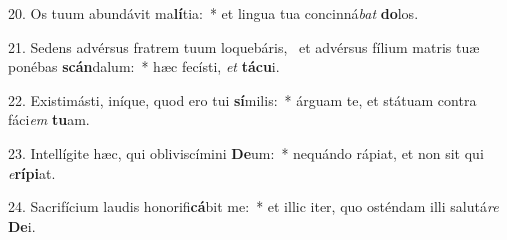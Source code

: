 20. Os tuum abundávit ma\textbf{lí}tia:~*  et lingua tua concinná\textit{bat} \textbf{do}los.\

21. Sedens advérsus fratrem tuum loquebáris, \dag\  et advérsus fílium matris tuæ ponébas \textbf{scán}dalum:~*  hæc fecísti, \textit{et} \textbf{tá}\textbf{cu}i.\

22. Existimásti, iníque, quod ero tui \textbf{sí}milis:~*  árguam te, et státuam contra fáci\textit{em} \textbf{tu}am.\

23. Intellígite hæc, qui obliviscímini \textbf{De}um:~*  nequándo rápiat, et non sit qui \textit{e}\textbf{rí}\textbf{pi}at.\

24. Sacrifícium laudis honorifi\textbf{cá}bit me:~*  et illic iter, quo osténdam illi salutá\textit{re} \textbf{De}i.\

